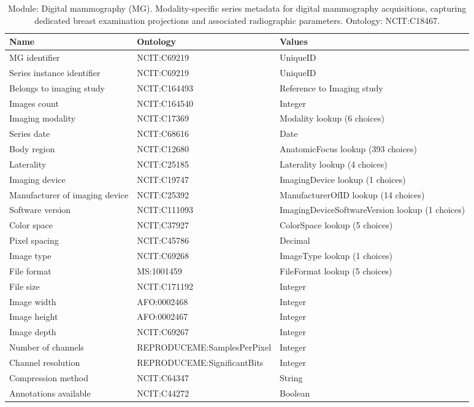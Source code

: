 \documentclass{article}
\begin{document}
\begin{table}[htb]
\begin{tabular}{lll}
Name & Ontology & Values \\
\hline
MG identifier & NCIT:C69219 & UniqueID \\
Series instance identifier & NCIT:C69219 & UniqueID \\
Belongs to imaging study & NCIT:C164493 & Reference to Imaging study \\
Images count & NCIT:C164540 & Integer \\
Imaging modality & NCIT:C17369 & Modality lookup (6 choices) \\
Series date & NCIT:C68616 & Date \\
Body region & NCIT:C12680 & AnatomicFocus lookup (393 choices) \\
Laterality & NCIT:C25185 & Laterality lookup (4 choices) \\
Imaging device & NCIT:C19747 & ImagingDevice lookup (1 choices) \\
Manufacturer of imaging device & NCIT:C25392 & ManufacturerOfID lookup (14 choices) \\
Software version & NCIT:C111093 & ImagingDeviceSoftwareVersion lookup (1 choices) \\
Color space & NCIT:C37927 & ColorSpace lookup (5 choices) \\
Pixel spacing & NCIT:C45786 & Decimal \\
Image type & NCIT:C69268 & ImageType lookup (1 choices) \\
File format & MS:1001459 & FileFormat lookup (5 choices) \\
File size & NCIT:C171192 & Integer \\
Image width & AFO:0002468 & Integer \\
Image height & AFO:0002467 & Integer \\
Image depth & NCIT:C69267 & Integer \\
Number of channels & REPRODUCEME:SamplesPerPixel & Integer \\
Channel resolution & REPRODUCEME:SignificantBits & Integer \\
Compression method & NCIT:C64347 & String \\
Annotations available & NCIT:C44272 & Boolean \\
\hline
\end{tabular}
\caption[Module: Digital mammography (MG)]{\label{table:table19} Module: Digital mammography (MG). Modality-specific series metadata for digital mammography acquisitions, capturing dedicated breast examination projections and associated radiographic parameters. Ontology: NCIT:C18467. }
\end{table}
\end{document}
